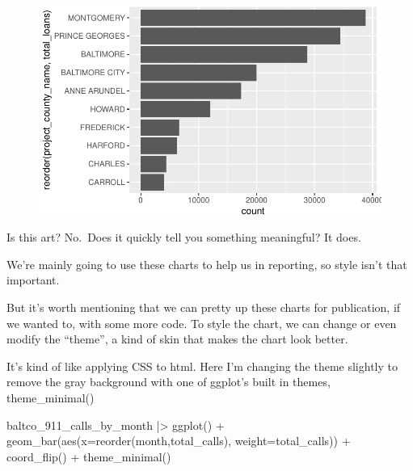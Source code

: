 \documentclass[
  letterpaper,
  DIV=11,
  numbers=noendperiod]{scrreprt}
\newenvironment{Shaded}{\begin{snugshade}}{\end{snugshade}}
\newcommand{\AttributeTok}[1]{\textcolor[rgb]{0.40,0.45,0.13}{#1}}
\newcommand{\FunctionTok}[1]{\textcolor[rgb]{0.28,0.35,0.67}{#1}}
\newcommand{\NormalTok}[1]{\textcolor[rgb]{0.00,0.23,0.31}{#1}}
\newcommand{\SpecialCharTok}[1]{\textcolor[rgb]{0.37,0.37,0.37}{#1}}
\begin{document}
\begin{figure}[H]

{\centering \includegraphics{./visualizing-for-reporting_files/figure-pdf/unnamed-chunk-7-1.pdf}

}

\end{figure}

Is this art? No.~Does it quickly tell you something meaningful? It does.

We're mainly going to use these charts to help us in reporting, so style
isn't that important.

But it's worth mentioning that we can pretty up these charts for
publication, if we wanted to, with some more code. To style the chart,
we can change or even modify the ``theme'', a kind of skin that makes
the chart look better.

It's kind of like applying CSS to html. Here I'm changing the theme
slightly to remove the gray background with one of ggplot's built in
themes, theme\_minimal()

\begin{Shaded}
\begin{Highlighting}[]
\NormalTok{baltco\_911\_calls\_by\_month }\SpecialCharTok{|\textgreater{}}
  \FunctionTok{ggplot}\NormalTok{() }\SpecialCharTok{+}
  \FunctionTok{geom\_bar}\NormalTok{(}\FunctionTok{aes}\NormalTok{(}\AttributeTok{x=}\FunctionTok{reorder}\NormalTok{(month,total\_calls), }\AttributeTok{weight=}\NormalTok{total\_calls)) }\SpecialCharTok{+}
  \FunctionTok{coord\_flip}\NormalTok{() }\SpecialCharTok{+} 
  \FunctionTok{theme\_minimal}\NormalTok{()}
\end{Highlighting}
\end{Shaded}
\end{document}
